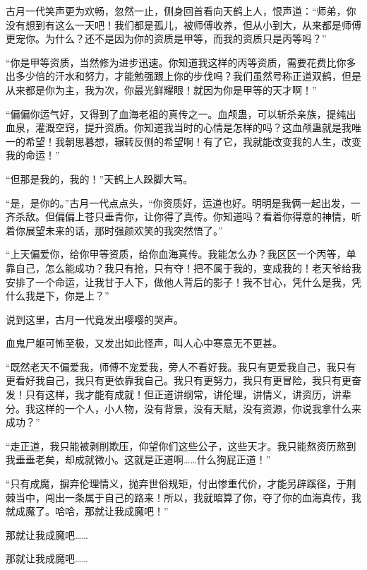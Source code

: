 
\begin{this_body}

古月一代笑声更为欢畅，忽然一止，侧身回首看向天鹤上人，恨声道：“师弟，你没有想到有这么一天吧！我们都是孤儿，被师傅收养，但从小到大，从来都是师傅更宠你。为什么？还不是因为你的资质是甲等，而我的资质只是丙等吗？”

“你是甲等资质，当然修为进步迅速。你知道我这样的丙等资质，需要花费比你多出多少倍的汗水和努力，才能勉强跟上你的步伐吗？我们虽然号称正道双鹤，但是从来都是你为主，我为次，你最光鲜耀眼！就因为你是甲等的天才啊！”

“偏偏你运气好，又得到了血海老祖的真传之一。血颅蛊，可以斩杀亲族，提纯出血泉，灌溉空窍，提升资质。你知道我当时的心情是怎样的吗？这血颅蛊就是我唯一的希望！我朝思暮想，辗转反侧的希望啊！有了它，我就能改变我的人生，改变我的命运！”

“但那是我的，我的！”天鹤上人跺脚大骂。

“是，是你的。”古月一代点点头，“你资质好，运道也好。明明是我俩一起出发，一齐杀敌。但偏偏上苍只垂青你，让你得了真传。你知道吗？看着你得意的神情，听着你展望未来的话，那时强颜欢笑的我突然悟了。”

“上天偏爱你，给你甲等资质，给你血海真传。我能怎么办？我区区一个丙等，单靠自己，怎么能成功？我只有抢，只有夺！把不属于我的，变成我的！老天爷给我安排了一个命运，让我甘于人下，做他人背后的影子！我不甘心，凭什么是我，凭什么我是下，你是上？”

说到这里，古月一代竟发出嘤嘤的哭声。

血鬼尸躯可怖至极，又发出如此怪声，叫人心中寒意无不更甚。

“既然老天不偏爱我，师傅不宠爱我，旁人不看好我。我只有更爱我自己，我只有更看好我自己，我只有更依靠我自己。我只有更努力，我只有更冒险，我只有更奋发！只有这样，我才能有成就！但正道讲纲常，讲伦理，讲情义，讲资历，讲辈分。我这样的一个人，小人物，没有背景，没有天赋，没有资源，你说我拿什么来成功？”

“走正道，我只能被剥削欺压，仰望你们这些公子，这些天才。我只能熬资历熬到我垂垂老矣，却成就微小。这就是正道啊……什么狗屁正道！”

“只有成魔，摒弃伦理情义，抛弃世俗规矩，付出惨重代价，才能另辟蹊径，于荆棘当中，闯出一条属于自己的路来！所以，我就暗算了你，夺了你的血海真传，我就成魔了。哈哈，那就让我成魔吧！”

那就让我成魔吧……

那就让我成魔吧……


\end{this_body}
